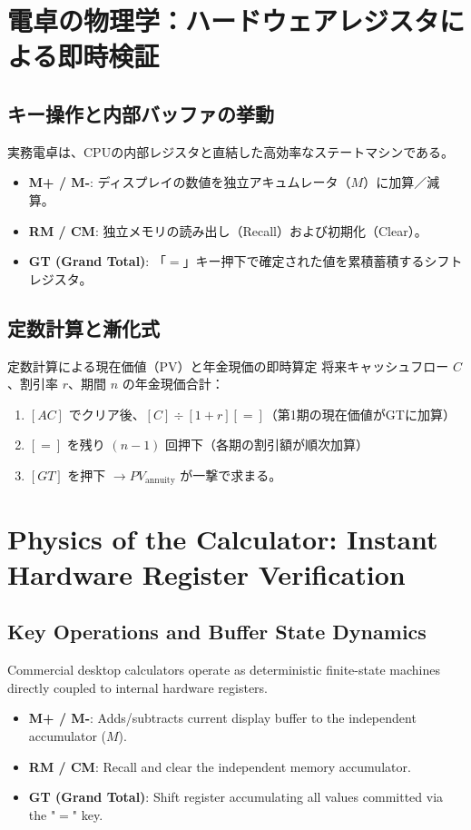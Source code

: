 \ifja
\chapter{電卓の物理学：ハードウェアレジスタによる即時検証}
\label{chap:calculator_physics}

\section{キー操作と内部バッファの挙動}
実務電卓は、CPUの内部レジスタと直結した高効率なステートマシンである。
\begin{itemize}
    \item \textbf{M+ / M-}: ディスプレイの数値を独立アキュムレータ（$M$）に加算／減算。
    \item \textbf{RM / CM}: 独立メモリの読み出し（Recall）および初期化（Clear）。
    \item \textbf{GT (Grand Total)}: 「$=$」キー押下で確定された値を累積蓄積するシフトレジスタ。
\end{itemize}

\section{定数計算と漸化式}


\begin{calcbox}{定数計算による現在価値（PV）と年金現価の即時算定}
将来キャッシュフロー $C$、割引率 $r$、期間 $n$ の年金現価合計：
\begin{enumerate}
    \item $[AC]$ でクリア後、$[C] \div [1 + r] [=]$（第1期の現在価値がGTに加算）
    \item $[=]$ を残り $(n-1)$ 回押下（各期の割引額が順次加算）
    \item $[GT]$ を押下 $\to PV_{\text{annuity}}$ が一撃で求まる。
\end{enumerate}
\end{calcbox}

\else
\chapter{Physics of the Calculator: Instant Hardware Register Verification}
\label{chap:calculator_physics}

\section{Key Operations and Buffer State Dynamics}
Commercial desktop calculators operate as deterministic finite-state machines directly coupled to internal hardware registers.
\begin{itemize}
    \item \textbf{M+ / M-}: Adds/subtracts current display buffer to the independent accumulator ($M$).
    \item \textbf{RM / CM}: Recall and clear the independent memory accumulator.
    \item \textbf{GT (Grand Total)}: Shift register accumulating all values committed via the "$=$" key.
\end{itemize}

